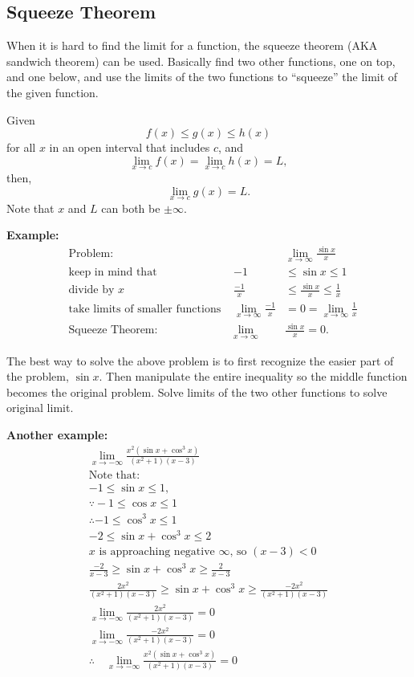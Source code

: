 \documentclass[12pt]{article}
\begin{document}
\subsection{Squeeze Theorem}
When it is hard to find the limit for a function, the squeeze theorem (AKA sandwich theorem) can be used. Basically find two other functions, one on top, and one below, and use the limits of the two functions to ``squeeze'' the limit of the given function.

\noindent Given
\[ f(x) \le g(x) \le h(x) \]
for all $x$ in an open interval that includes $c$, and
\[ \lim_{x \to c} f(x) = \lim_{x \to c} h(x) = L, \]
then,
\[ \lim_{x \to c} g(x) = L. \]
Note that $x$ and $L$ can both be $\pm \infty$.

\noindent \textbf{Example:}
\begin{align*}
     & \text{Problem:}                          &                                  & \lim_{x \to \infty} \frac{\sin{x}}{x} \\[6pt]
     & \text{keep in mind that}                 & -1                               & \le \sin{x} \le 1                     \\
     & \text{divide by $x$}                     & \frac{-1}{x}                     & \le \frac{\sin{x}}{x} \le \frac{1}{x} \\[6pt]
     & \text{take limits of smaller functions } & \lim_{x \to \infty} \frac{-1}{x} & = 0 = \lim_{x \to \infty} \frac{1}{x} \\[6pt]
     & \text{Squeeze Theorem:}                  & \lim_{x \to \infty}              & \frac{\sin{x}}{x} = 0.
\end{align*}

The best way to solve the above problem is to first recognize the easier part of the problem, $\sin{x}$. Then manipulate the entire inequality so the middle function becomes the original problem. Solve limits of the two other functions to solve original limit.

\noindent \textbf{Another example:}
\begin{gather*}
    \lim_{x \to -\infty} \frac{x^2(\sin{x} + \cos^{3}{x})}{(x^2+1)(x-3)} \\[8pt]
    \text{Note that:} \\
    -1 \le \sin{x} \le 1, \\
    \because -1 \le \cos{x} \le {1} \\
    \therefore -1 \le \cos^{3}{x} \le 1 \\
    -2 \le \sin{x} + \cos^{3}{x} \le 2 \\[8pt]
    \text{$x$ is approaching negative $\infty$, so $(x-3) < 0$} \\
    \frac{-2}{x-3} \ge \sin{x} + \cos^{3}{x} \ge \frac{2}{x-3} \\[6pt]
    \frac{2x^2}{(x^2+1)(x-3)} \ge \sin{x} + \cos^{3}{x} \ge \frac{-2x^2}{(x^2+1)(x-3)} \\[10pt]
    \lim_{x \to -\infty}\frac{2x^2}{(x^2+1)(x-3)} = 0 \\[6pt]
    \lim_{x \to -\infty}\frac{-2x^2}{(x^2+1)(x-3)} = 0 \\[6pt]
    \therefore \quad \lim_{x \to -\infty} \frac{x^2(\sin{x} + \cos^{3}{x})}{(x^2+1)(x-3)} = 0
\end{gather*}
\end{document}
